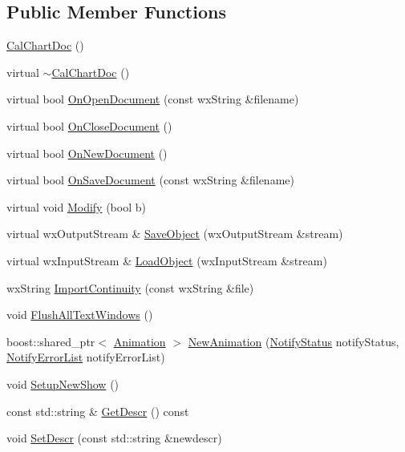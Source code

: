 \subsection*{Public Member Functions}
\begin{DoxyCompactItemize}
\item 
\hyperlink{a00020_a8a872d648b6e3b4f266174a0acfdc9fc}{Cal\-Chart\-Doc} ()
\item 
virtual \hyperlink{a00020_a14812da32f9bd5e002b6b118f7b010da}{$\sim$\-Cal\-Chart\-Doc} ()
\item 
virtual bool \hyperlink{a00020_a0e877ef3a12b3517e55c2f9c1289e4f6}{On\-Open\-Document} (const wx\-String \&filename)
\item 
virtual bool \hyperlink{a00020_a4b63a837f554888d1da135139e01b14d}{On\-Close\-Document} ()
\item 
virtual bool \hyperlink{a00020_a381f76c44e5e5ba713d4976fef1869af}{On\-New\-Document} ()
\item 
virtual bool \hyperlink{a00020_a345b07be3b8de12a585c1d1b94979470}{On\-Save\-Document} (const wx\-String \&filename)
\item 
virtual void \hyperlink{a00020_a416ddefdb179e2c5a8bfcb37c9478fe4}{Modify} (bool b)
\item 
virtual wx\-Output\-Stream \& \hyperlink{a00020_a54e00f93eb412376423397723fc65598}{Save\-Object} (wx\-Output\-Stream \&stream)
\item 
virtual wx\-Input\-Stream \& \hyperlink{a00020_ab7865ea2508bf7164e31a09af935e064}{Load\-Object} (wx\-Input\-Stream \&stream)
\item 
wx\-String \hyperlink{a00020_a1a6a217147ecfd305e4a26c5f9b80c2b}{Import\-Continuity} (const wx\-String \&file)
\item 
void \hyperlink{a00020_a95afc07cf9b63a410fc0bf374e1ee497}{Flush\-All\-Text\-Windows} ()
\item 
boost\-::shared\-\_\-ptr$<$ \hyperlink{a00010}{Animation} $>$ \hyperlink{a00020_a7da13b0aa139317724bfe184f13f7f4f}{New\-Animation} (\hyperlink{a00195_aef08fe65401b34c561d7d6fc0ff39b60}{Notify\-Status} notify\-Status, \hyperlink{a00195_a9f9c725e3e1c76c65ddb676bf591d49b}{Notify\-Error\-List} notify\-Error\-List)
\item 
void \hyperlink{a00020_af7fe59d238be4bb9c153cd3e25b12a84}{Setup\-New\-Show} ()
\item 
const std\-::string \& \hyperlink{a00020_a58ec7334fcd1caec3d4e6a4052ebf0c5}{Get\-Descr} () const 
\item 
void \hyperlink{a00020_a0e1bc530f6bc782c906d3f618f3c82b9}{Set\-Descr} (const std\-::string \&newdescr)

\end{DoxyCompactItemize}
